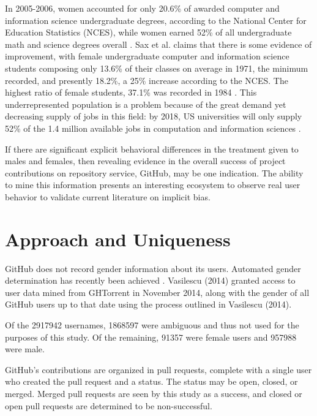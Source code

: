 \documentclass[10pt]{sigplanconf}
\begin{document}
In 2005-2006, women accounted for only 20.6\% of awarded computer and information
science undergraduate degrees, according to the National Center for Education
Statistics (NCES), while women earned 52\% of all undergraduate
math and science degrees overall \citep{genderdiversitycomputing}.
Sax et al. claims that there is some evidence of improvement, with female
undergraduate computer and information science students composing only 13.6\% of
their classes on average in 1971, the minimum recorded, and presently 18.2\%, a
25\% increase according to the NCES. The highest ratio of female students,
37.1\% was recorded in 1984 \citep{evolutionofwomen}.
This underrepresented population is a problem because of the great demand yet
decreasing supply of jobs in this field: by 2018, US universities will only
supply 52\% of the 1.4 million available jobs in computation and information
sciences \citep{genderdiversitycomputing}.



If there are significant explicit behavioral differences in the
treatment given to males and females, then revealing evidence in the overall success of
project contributions on
repository service, GitHub, may be one indication. The ability to mine this information
presents an interesting ecosystem to observe real user behavior to validate current
literature on implicit bias.

\section{Approach and Uniqueness}

GitHub does not record gender information about its users. Automated gender
determination has recently been achieved \cite{VasilescuIWC13}.
Vasilescu (2014) granted access to user data mined from GHTorrent in November 2014,
along with the gender of all GitHub users up to that date using the process
outlined in Vasilescu (2014).

Of the \num{2917942} usernames, \num{1868597} were ambiguous and thus
not used for the purposes of this study. Of the remaining, \num{91357} were
female users and \num{957988} were male.

GitHub's contributions are organized in pull requests, complete with a single
user who created the pull request and a status. The status may be open, closed,
or merged. Merged pull requests are seen by this study as a success, and closed
or open pull requests are determined to be non-successful.
\end{document}
